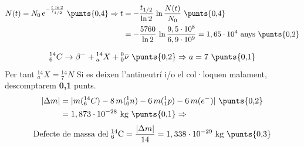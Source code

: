 \begin{solapartat}
\begin{align*}
N(t) = N_0\,\mathrm{e}^{-\frac{t\,\ln 2}{t_{1/2}}} \ \text{\punts{0,4}} \Rightarrow t &= -\frac{t_{1/2}}{\ln 2}\,\ln\frac{N(t)}{N_0} \ \text{\punts{0,4}}\\
&= -\frac{5760}{\ln 2}\,\ln\frac{9,5\cdot 10^{8}}{6,9\cdot 10^{9}} = 1,65\cdot 10^{4}\ \text{anys} \ \text{\punts{0,2}}
\end{align*}
\end{solapartat}

\begin{solapartat}
\[ {}^{14}_{6}C \rightarrow \beta^- + {}^{14}_{a}X + {}^{0}_{0}\bar{\nu} \ \text{\punts{0,2}} \Rightarrow a = 7 \ \text{\punts{0,1}} \]
Per tant ${}^{14}_{a}X = {}^{14}_{7}N$  Si es deixen l'antineutrí i/o el col·loquen malament, descomptarem \textbf{0,1} punts.
\begin{align*}
|\Delta m| &= |m({}^{14}_{6}C) - 8\,m({}^{1}_{0}n) - 6\,m({}^{1}_{1}p) - 6\,m(e^-)| \ \text{\punts{0,2}}\\
&= 1,873\cdot 10^{-28}\ \mathrm{kg} \ \text{\punts{0,1}} \Rightarrow
\end{align*}
\[ \text{Defecte de massa del } {}^{14}_{6}\mathrm{C} = \frac{|\Delta m|}{14} = 1,338\cdot 10^{-29}\ \mathrm{kg} \ \text{\punts{0,3}} \]
\end{solapartat}
